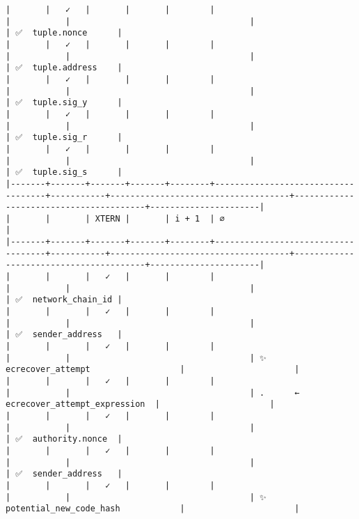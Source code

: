 \documentclass[varwidth=\maxdimen,margin=0.5cm,multi={verbatim}]{standalone}
\begin{document}
\begin{verbatim}
|       |   ✓   |       |       |        |                                    |           |                                    |                                        | ✅  tuple.nonce      |
|       |   ✓   |       |       |        |                                    |           |                                    |                                        | ✅  tuple.address    |
|       |   ✓   |       |       |        |                                    |           |                                    |                                        | ✅  tuple.sig_y      |
|       |   ✓   |       |       |        |                                    |           |                                    |                                        | ✅  tuple.sig_r      |
|       |   ✓   |       |       |        |                                    |           |                                    |                                        | ✅  tuple.sig_s      |
|-------+-------+-------+-------+--------+------------------------------------+-----------+------------------------------------+----------------------------------------+----------------------|
|       |       | XTERN |       | i + 1  | ∅                                  |
|-------+-------+-------+-------+--------+------------------------------------+-----------+------------------------------------+----------------------------------------+----------------------|
|       |       |   ✓   |       |        |                                    |           |                                    |                                        | ✅  network_chain_id |
|       |       |   ✓   |       |        |                                    |           |                                    |                                        | ✅  sender_address   |
|       |       |   ✓   |       |        |                                    |           |                                    | ✨  ecrecover_attempt                  |                      |
|       |       |   ✓   |       |        |                                    |           |                                    | .      ← ecrecover_attempt_expression  |                      |
|       |       |   ✓   |       |        |                                    |           |                                    |                                        | ✅  authority.nonce  |
|       |       |   ✓   |       |        |                                    |           |                                    |                                        | ✅  sender_address   |
|       |       |   ✓   |       |        |                                    |           |                                    | ✨  potential_new_code_hash            |                      |

\end{verbatim}
\end{document}
